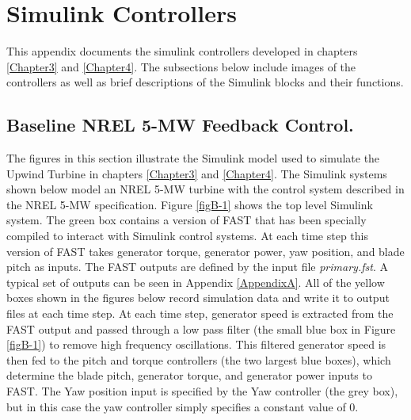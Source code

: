 
\chapter{Simulink Controllers} %

\label{AppendixB} %

This appendix documents the simulink controllers developed in chapters \ref{Chapter3} and \ref{Chapter4}. The subsections below include images of the controllers as well as brief descriptions of the Simulink blocks and their functions.

\section{Baseline NREL 5-MW Feedback Control.} \label{sectionB-1}

The figures in this section illustrate the Simulink model used to simulate the Upwind Turbine in chapters \ref{Chapter3} and \ref{Chapter4}. The Simulink systems shown below model an NREL 5-MW turbine with the control system described in the NREL 5-MW specification\cite{jonkman2009}. Figure \ref{figB-1} shows the top level Simulink system. The green box contains a version of FAST that has been specially compiled to interact with Simulink control systems. At each time step this version of FAST takes generator torque, generator power, yaw position, and blade pitch as inputs. The FAST outputs are defined by the input file \textit{primary.fst}. A typical set of outputs can be seen in Appendix \ref{AppendixA}. All of the yellow boxes shown in the figures below record simulation data and write it to output files at each time step. At each time step, generator speed is extracted from the FAST output and passed through a low pass filter (the small blue box in Figure \ref{figB-1}) to remove high frequency oscillations. This filtered generator speed is then fed to the pitch and torque controllers (the two largest blue boxes), which determine the blade pitch, generator torque, and generator power inputs to FAST. The Yaw position input is specified by the Yaw controller (the grey box), but in this case the yaw controller simply specifies a constant value of 0\degree.

